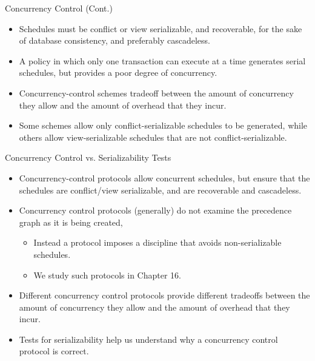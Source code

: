 \documentclass{beamer}
\begin{document}
\begin{frame}{Concurrency Control (Cont.)}

    \begin{itemize}
        \item Schedules must be conflict or view serializable, and recoverable, for the sake of database consistency, and preferably cascadeless.
        \item A policy in which only one transaction can execute at a time generates serial schedules, but provides a poor degree of concurrency.
        \item Concurrency-control schemes tradeoff between the amount of concurrency they allow and the amount of overhead that they incur.
        \item Some schemes allow only conflict-serializable schedules to be generated, while others allow view-serializable schedules that are not conflict-serializable.
    \end{itemize}

\end{frame}

\begin{frame}{Concurrency Control vs. Serializability Tests}

    \begin{itemize}
        \item Concurrency-control protocols allow concurrent schedules, but ensure that the schedules are conflict/view serializable, and are recoverable and cascadeless.
        \item Concurrency control protocols (generally) do not examine the precedence graph as it is being created,
            \begin{itemize}
                \item Instead a protocol imposes a discipline that avoids non-serializable schedules.
                \item We study such protocols in Chapter 16.
            \end{itemize}
        \item Different concurrency control protocols provide different tradeoffs between the amount of concurrency they allow and the amount of overhead that they incur.
        \item Tests for serializability help us understand why a concurrency control protocol is correct.
    \end{itemize}

\end{frame}
\end{document}
